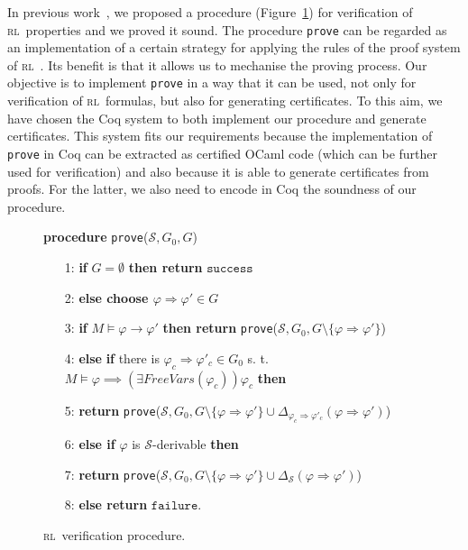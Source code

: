 \documentclass[10pt,a4wide]{article}
\newcommand{\Ra}{\Rightarrow}
\newcommand{\rrule}[2]{{#1} \Ra{#2}}
\newcommand{\RL}{\textsc{rl}~}
\renewcommand{\S}{\mathcal{S}}
\newcommand{\failure}{\mathtt{failure}}
\newcommand{\success}{\mathtt{success}}
\newcommand{\FreeVars}{\mathit{FreeVars}}
\begin{document}
In previous work~\cite{vrlprls}, we proposed a procedure (Figure~\ref{fig:prove}) for verification of \RL properties and we proved it sound. 
The procedure \texttt{prove} can be regarded as an implementation of a certain strategy for applying the rules of the proof system of \RL.
Its benefit is that it allows us to mechanise the proving process.
Our objective is to implement \texttt{prove} in a way that it can be used, not only for verification of \RL formulas, but also for generating certificates.
To this aim, we have chosen the Coq system to both implement our procedure and generate certificates. 
This system fits our requirements because the implementation of \texttt{prove} in Coq can be extracted as certified OCaml code (which can be further used for verification) and also because it is able to generate certificates from proofs.
For the latter, we also need to encode in Coq the soundness of our procedure.



\begin{figure}[t]
\fontsize{9}{10}
\selectfont
\textbf{procedure} \texttt{prove}($\S,  G_0, G$)  
\begin{itemize}
\item[1:] \textbf{if} $G = \emptyset$ \textbf{then return} $\success$ 
\item[2:] \quad \textbf{\textbf{else} \textbf{choose} $\rrule{\varphi}{\varphi'} \in G$}  
\item[3:] \quad \quad \textbf{if} $M\models \varphi \rightarrow \varphi'$ \textbf{then return} \texttt{prove}($\S, G_0, G\setminus \{ \rrule{\varphi}{\varphi'} \}$)  
\item[4:] \quad \quad \textbf{else} \textbf{if} there is $ \rrule{\varphi_c}{\varphi'_c} \in G_0$ s. t. $M\models\varphi\implies (\exists\FreeVars(\varphi_c))\varphi_c$ 
\textbf{then}   
\item[5:] \qquad \qquad
\textbf{return} \texttt{prove}($\S,G_0,G\setminus \{ \rrule{\varphi}{\varphi'} \}  \cup \Delta_{\rrule{\varphi_c}{\varphi'_c}}(\rrule{\varphi}{\varphi'}) $) 
\item[6:] \quad \quad \textbf{else if}  $\varphi$ is $\S$-derivable \textbf{then}
\item[7:] \qquad \qquad
\textbf{return} \texttt{prove}($\S,G_0,G\setminus \{ \rrule{\varphi}{\varphi'}  \} \cup\Delta_{\S}(\rrule{\varphi}{\varphi'}) $)
\item[8:] \quad \quad \textbf{else return} $\failure$.
\end{itemize}
\caption{\label{fig:prove} \RL verification procedure.}
\end{figure}
\end{document}
